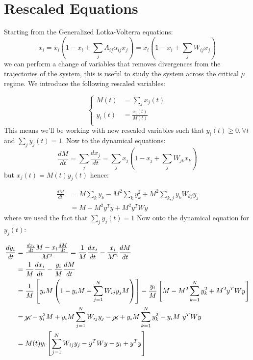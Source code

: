 \chapter{Rescaled Equations}

Starting from the Generalized Lotka-Volterra equations:
$$
\dot{x}_i = x_i \left(1-x_i + \sum_j A_{ij}\alpha_{ij}x_j\right) = x_i \left(1-x_i +\sum_j W_{ij}x_j\right)
$$
we can perform a change of variables that removes divergences from the trajectories of the system, this is useful to study the system across the critical $\mu$ regime.
We introduce the following rescaled variables:

\begin{equation}
    \left\{
        \begin{aligned}
        M(t) &= \sum_j x_j (t)\\
        y_i(t) &= \frac{x_i(t)}{M(t)} \\
        \end{aligned}
    \right.
\end{equation}
This means we'll be working with new rescaled variables such that $y_i(t) \ge 0, \forall t$ and $\sum_j y_j(t) = 1$.
Now to the dynamical equations:
$$
\frac{dM}{dt}= \sum_j \frac{dx_j}{dt} = \sum_j x_j\left(1-x_j+\sum_jW_{jk}x_k\right)
$$
but $x_j(t) = M(t)y_j(t)$ hence:

\begin{equation}
    \begin{aligned}
    \frac{dM}{dt} &= M \sum_k y_k - M^2 \sum_k y_k^2 + M^2 \sum_{k,j} y_k W_{kj} y_j \\
                  &= M - M^2 y^T y + M^2 y^T Wy
    \end{aligned}
\end{equation}
where we used the fact that $\sum_j y_j(t) = 1$
Now onto the dynamical equation for $y_j(t)$:

\begin{equation}
    \begin{aligned}
        \frac{dy_i}{dt} &= \frac{\frac{dx_i}{dt} M - x_i \frac{dM}{dt}}{M^2} = \frac{1}{M} \frac{dx_i}{dt} - \frac{x_i}{M^2} \frac{dM}{dt} \\
        &= \frac{1}{M} \frac{dx_i}{dt} - \frac{y_i}{M} \frac{dM}{dt} \\
        &= \frac{1}{M} \left[ y_i M \left( 1 - y_i M + \sum_{j=1}^N W_{ij} y_j M \right) \right] - \frac{y_i}{M} \left[ M - M^2 \sum_{k=1}^N y_k^2 + M^2 y^T W y \right] \\
        &= \cancel{y_i} - y_i^2 M + y_i M \sum_{j=1}^N W_{ij} y_j - \cancel{y_i} + y_i M \sum_{k=1}^N y_k^2 - y_i M \  y^T W y \\
        &= M(t) y_i \left[ \sum_{j=1}^N W_{ij} y_j - y^T W y - y_i +  y^T y\right]
    \end{aligned}
\end{equation}

